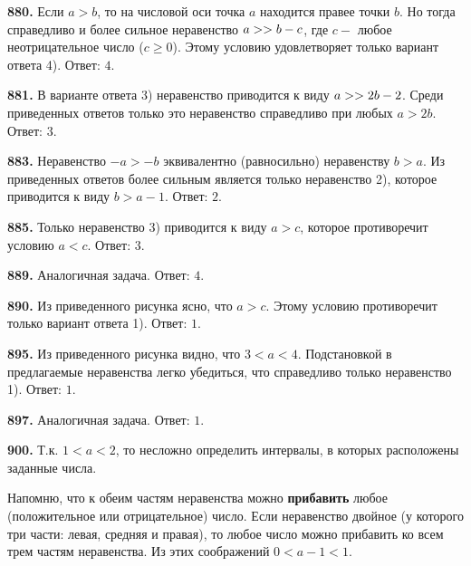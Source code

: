 \textbf{880.} Если $a>b$, то на числовой оси точка $a$ находится правее точки $b$. Но тогда  справедливо и более сильное неравенство $a>\linebreak>b-c$, где $c-$ любое неотрицательное число ($c\geq0$). Этому условию удовлетворяет  только вариант ответа 4). \newline \null \hspace*{\fill} Ответ: $4$.

\textbf{881.} В варианте ответа 3) неравенство приводится к виду $a>\linebreak>2b-2$. Среди приведенных ответов только это неравенство справедливо при  любых $a>2b$. \newline \null \hspace*{\fill} Ответ: $3$.

\textbf{883.} Неравенство $-a>-b$ эквивалентно (равносильно) неравенству $b>a$. Из приведенных ответов  более сильным является только неравенство 2), которое приводится к виду $b>a-1$. \newline \null \hspace*{\fill} Ответ: $2$. 

\textbf{885.} Только неравенство 3) приводится к виду $a>c$, которое противоречит условию $a<c$. \newline \null \hspace*{\fill} Ответ: $3$. 

\textbf{889.} Аналогичная задача. \newline \null \hspace*{\fill} Ответ: $4$. 

\textbf{890.} Из приведенного рисунка ясно, что $a>c$. Этому условию противоречит только вариант ответа 1). \newline \null \hspace*{\fill} Ответ: $1$. 

\textbf{895.} Из приведенного рисунка видно, что $3<a<4$. Подстановкой в предлагаемые неравенства легко убедиться, что справедливо только неравенство 1). \newline \null \hspace*{\fill} Ответ: $1$.

\textbf{897.} Аналогичная задача. \newline \null \hspace*{\fill} Ответ: $1$. 

\textbf{900.} Т.к. $1<a<2$, то несложно определить интервалы, в которых расположены заданные числа.  

Напомню, что к обеим частям  неравенства можно \textbf{прибавить} любое (положительное или отрицательное) число. Если неравенство двойное (у которого три части: левая, средняя и правая), то любое число можно прибавить ко всем трем частям неравенства. Из этих соображений $0<a-1<1$.

